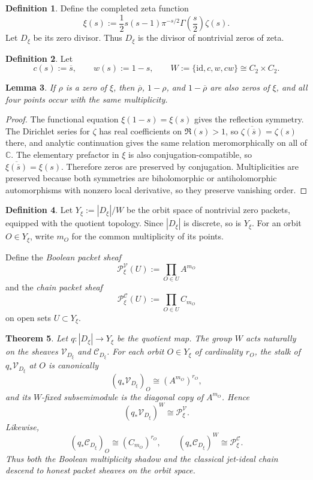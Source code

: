\documentclass[11pt,a4paper]{article}
\newtheorem{theorem}{Theorem}[section]
\newtheorem{lemma}[theorem]{Lemma}
\theoremstyle{definition}
\newtheorem{definition}[theorem]{Definition}
\theoremstyle{remark}
\newcommand{\CC}{\mathbb C}
\newcommand{\cV}{\mathcal V}
\newcommand{\cC}{\mathcal C}
\begin{document}
\begin{definition}
Define the completed zeta function
\[
\xi(s):=\frac12 s(s-1)\pi^{-s/2}\Gamma\!\left(\frac s2\right)\zeta(s).
\]
Let $D_\xi$ be its zero divisor.  Thus $D_\xi$ is the divisor of nontrivial zeros of zeta.
\end{definition}

\begin{definition}
Let
\[
c(s):=\overline{s},
\qquad
w(s):=1-s,
\qquad
W:=\{\mathrm{id},c,w,cw\}\cong C_2\times C_2.
\]
\end{definition}

\begin{lemma}\label{lem:xi-symmetry-multiplicity}
If $\rho$ is a zero of $\xi$, then $\overline\rho$, $1-\rho$, and $1-\overline\rho$ are also zeros of $\xi$, and all four points occur with the same multiplicity.
\end{lemma}

\begin{proof}
The functional equation $\xi(1-s)=\xi(s)$ gives the reflection symmetry.  The Dirichlet series for $\zeta$ has real coefficients on $\Re(s)>1$, so $\overline{\zeta(\overline s)}=\zeta(s)$ there, and analytic continuation gives the same relation meromorphically on all of $\CC$.  The elementary prefactor in $\xi$ is also conjugation-compatible, so $\overline{\xi(\overline s)}=\xi(s)$.  Therefore zeros are preserved by conjugation.  Multiplicities are preserved because both symmetries are biholomorphic or antiholomorphic automorphisms with nonzero local derivative, so they preserve vanishing order.
\end{proof}

\begin{definition}
Let $Y_\xi:=|D_\xi|/W$ be the orbit space of nontrivial zero packets, equipped with the quotient topology.  Since $|D_\xi|$ is discrete, so is $Y_\xi$.  For an orbit $O\in Y_\xi$, write $m_O$ for the common multiplicity of its points.

Define the \emph{Boolean packet sheaf}
\[
\mathcal P_\xi^{\cV}(U):=\prod_{O\in U} A^{m_O}
\]
and the \emph{chain packet sheaf}
\[
\mathcal P_\xi^{\cC}(U):=\prod_{O\in U} C_{m_O}
\]
on open sets $U\subset Y_\xi$.
\end{definition}

\begin{theorem}\label{thm:packet-descent}
Let $q:|D_\xi|\to Y_\xi$ be the quotient map.  The group $W$ acts naturally on the sheaves $\cV_{D_\xi}$ and $\cC_{D_\xi}$.  For each orbit $O\in Y_\xi$ of cardinality $r_O$, the stalk of $q_*\cV_{D_\xi}$ at $O$ is canonically
\[
(q_*\cV_{D_\xi})_O\cong (A^{m_O})^{r_O},
\]
and its $W$-fixed subsemimodule is the diagonal copy of $A^{m_O}$.  Hence
\[
(q_*\cV_{D_\xi})^W\cong \mathcal P_\xi^{\cV}.
\]
Likewise,
\[
(q_*\cC_{D_\xi})_O\cong (C_{m_O})^{r_O},
\qquad
(q_*\cC_{D_\xi})^W\cong \mathcal P_\xi^{\cC}.
\]
Thus both the Boolean multiplicity shadow and the classical jet-ideal chain descend to honest packet sheaves on the orbit space.
\end{theorem}
\end{document}
